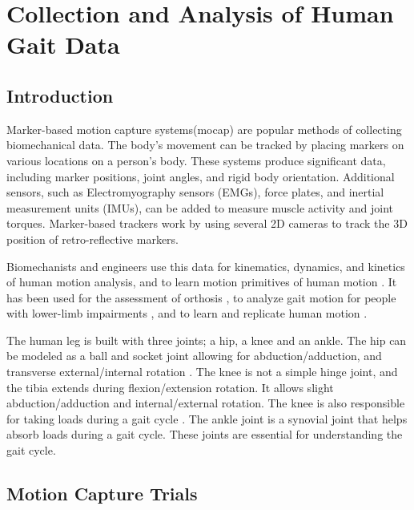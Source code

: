 \chapter{Collection and Analysis of Human Gait Data}
\label{chap:gaitdata}
\section{Introduction}

Marker-based motion capture systems(mocap) are popular methods of collecting biomechanical data. The body's movement can be tracked by placing markers on various locations on a person's body. These systems produce significant data, including marker positions, joint angles, and rigid body orientation. Additional sensors, such as Electromyography sensors (EMGs), force plates, and inertial measurement units (IMUs), can be added to measure muscle activity and joint torques. Marker-based trackers work by using several 2D cameras to track the 3D position of retro-reflective markers.  

Biomechanists and engineers use this data for kinematics, dynamics, and kinetics of human motion analysis, and to learn motion primitives of human motion \cite{10.7717/peerj.918}. It has been used for the assessment of orthosis \cite{kobetic2009development},  to analyze gait motion for people with lower-limb impairments \cite{lauer2005application} \cite{hicks2011lower}  \cite{cutler2015using} , and to learn and replicate human motion \cite{ott2008motion} \cite{chalodhorn2007learning}. 

The human leg is built with three joints; a hip, a knee and an ankle. The hip can be modeled as a ball and socket joint allowing for abduction/adduction, and transverse external/internal rotation \cite{faptakinesiology}. The knee is not a simple hinge joint, and the tibia extends during flexion/extension rotation. It allows slight abduction/adduction and internal/external rotation. The knee is also responsible for taking loads during a gait cycle \cite{kuo2007six}. The ankle joint is a synovial joint that helps absorb loads during a gait cycle. These joints are essential for understanding the gait cycle.


\section{Motion Capture Trials}

